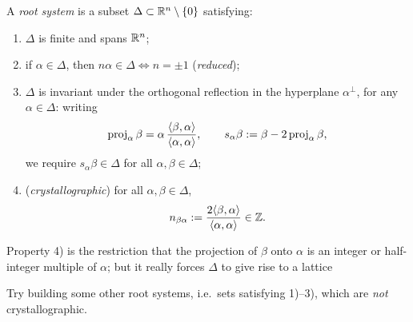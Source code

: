 \begin{definition}\label{L04a:def:rootsystem}
A \emph{root system} is a subset $\Delta\subset\mathbb{R}^n\setminus\{0\}$ satisfying:
\begin{enumerate}[label=\arabic*)]
\item $\Delta$ is finite and spans $\mathbb{R}^n$;
\item if $\alpha\in\Delta$, then $n\alpha\in\Delta \iff n=\pm1$ \quad(\emph{reduced});
\item $\Delta$ is invariant under the orthogonal reflection in the hyperplane $\alpha^\perp$, for any
  $\alpha\in\Delta$: writing
  \[
    \operatorname{proj}_\alpha\beta = \alpha\,\frac{\langle \beta, \alpha\rangle}{\langle \alpha, \alpha\rangle},\qquad
    s_\alpha\beta := \beta - 2\operatorname{proj}_\alpha\beta ,
  \]
  we require $s_\alpha\beta\in\Delta$ for all $\alpha,\beta\in\Delta$;
\item (\emph{crystallographic}) for all $\alpha,\beta\in\Delta$,
  \[
    n_{\beta\alpha} := \frac{2\langle \beta, \alpha\rangle}{\langle \alpha, \alpha\rangle}\in\mathbb{Z} .
  \]
\end{enumerate}
\end{definition}

\begin{center}
\end{center}

Property 4) is the restriction that the projection of $\beta$ onto $\alpha$ is an integer or
half-integer multiple of $\alpha$; but it really forces $\Delta$ to give rise to a lattice

\begin{exercise}
Try building some other root systems, i.e.\ sets satisfying 1)--3), which are \emph{not}
crystallographic.
\end{exercise}

